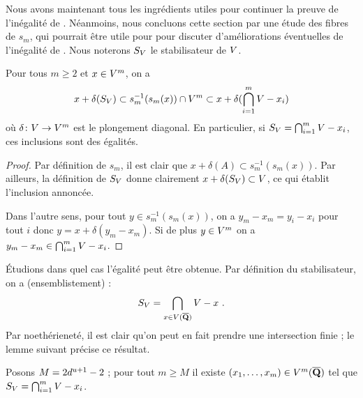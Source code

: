 Nous avons maintenant tous les ingrédients utiles pour continuer la preuve de
l'inégalité de . Néanmoins, nous concluons cette section par une
étude des fibres de \( s_m \), qui pourrait être utile pour pour discuter
d'améliorations éventuelles de l'inégalité de . Nous noterons \(
  S_V \) le stabilisateur de \( V \).

\begin{lem}
  Pour tous \( m \ge 2 \) et \( x \in V^m \), on a
  \begin{equation}
    x + \delta(S_V)
    \subset
    s_m^{-1} ( s_m(x) ) \cap V^m
    \subset
    x + \delta(\bigcap_{i=1}^m V - x_i)
  \end{equation}
  où \( \delta \colon V \to V^m \) est le plongement diagonal. En
  particulier, si \( S_V = \bigcap_{i=1}^m V - x_i \), ces inclusions
  sont des égalités.
\end{lem}

\begin{proof}
  Par définition de \( s_m \), il est clair que \( x + \delta(A) \subset
    s_m^{-1} ( s_m(x) ) \). Par ailleurs, la définition de \( S_V \) donne
  clairement \( x + \delta(S_V) \subset V \), ce qui établit
  l'inclusion annoncée.

  Dans l'autre sens, pour tout \( y \in s_m^{-1} ( s_m(x) ) \), on a
  \( y_m - x_m = y_i - x_i \) pour tout \( i \) donc \( y = x +
    \delta(y_m - x_m) \). Si de plus \( y \in V^m \) on a \( y_m - x_m \in
    \bigcap_{i=1}^m V - x_i \).
\end{proof}

Étudions dans quel cas l'égalité peut être obtenue. Par définition du
stabilisateur, on a (ensemblistement) :
\begin{equation}
  S_V = \bigcap_{x \in V(\overline{{\mathbf{Q}}})} V - x
  \text{ .}
\end{equation}
Par noethérieneté, il est clair qu'on peut en fait prendre une intersection
finie ; le lemme suivant précise ce résultat.

\begin{lem}
  Posons \( M = 2 d^{u+1} - 2 \) ; pour tout \( m \ge M \) il existe
  \( (x_1, \dots, x_m) \in V^m(\overline{{\mathbf{Q}}}) \) tel que
  \( S_V = \bigcap_{i=1}^m V - x_i \).
\end{lem}

